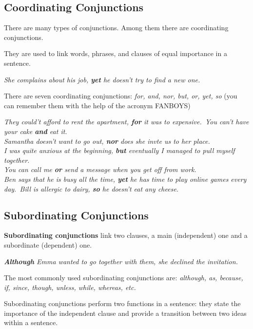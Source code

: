 \documentclass[hidelinks,10pt,a4paper]{article}
\begin{document}
\subsection{Coordinating Conjunctions}
There are many types of conjunctions. Among them there are coordinating conjunctions.

They are used to link words, phrases, and clauses of equal importance in a sentence.

\begin{center}
	\textit{She complains about his job, \textbf{yet} he doesn't try to find a new one.}
\end{center}

There are seven coordinating conjunctions: \textit{for, and, nor, but, or, yet, so} (you can remember them with the help of the acronym FANBOYS)

\begin{center}
	\textit{They could't afford to rent the apartment, \textbf{for} it was to expensive.\
	You can't have your cake \textbf{and} eat it.\\
	Samantha doesn't want to go out, \textbf{nor} does she invte us to her place.\\
	I was quite anxious at the beginning, \textbf{but} eventually I managed to pull myself together.\\
	You can call me \textbf{or} send a message when you get off from work.\\
	Ben says that he is busy all the time, \textbf{yet} he has time to play online games every day.\
	Bill is allergic to dairy, \textbf{so} he doesn't eat any cheese.}
\end{center}

\subsection{Subordinating Conjunctions}
\textbf{Subordinating conjunctions} link two clauses, a main (independent) one and a subordinate (dependent) one.

\begin{center}
	\textit{\textbf{Although} Emma wanted to go together with them, she declined the invitation.}
\end{center}

The most commonly used subordinating conjunctions are: \textit{although, as, because, if, since, though, unless, while, whereas, etc.}

Subordinating conjunctions perform two functions in a sentence: they state the importance of the independent clause and provide a transition between two ideas within a sentence.
\end{document}
